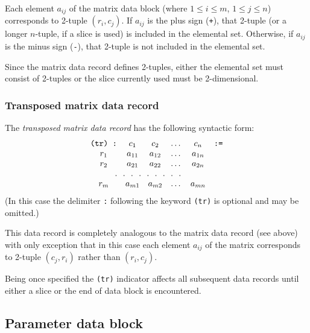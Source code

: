 \documentclass[10pt]{article}
\begin{document}
Each element $a_{ij}$ of the matrix data block (where $1\leq i\leq m$,
$1\leq j\leq n$) corresponds to 2-tuple $(r_i,c_j)$. If $a_{ij}$ is the
plus sign ({\tt+}), that 2-tuple (or a longer $n$-tuple, if a slice is
used) is included in the elemental set. Otherwise, if $a_{ij}$ is the
minus sign ({\tt-}), that 2-tuple is not included in the elemental set.

Since the matrix data record defines 2-tuples, either the elemental set
must consist of 2-tuples or the slice currently used must be
2-dimensional.

\subsubsection{Transposed matrix data record}

The {\it transposed matrix data record} has the following syntactic
form:
$$\begin{array}{cccccc}
\mbox{{\tt(tr) :}}&c_1&c_2&\dots&c_n&\mbox{{\tt:=}}\\
r_1&a_{11}&a_{12}&\dots&a_{1n}&\\
r_2&a_{21}&a_{22}&\dots&a_{2n}&\\
\multicolumn{5}{c}{.\ \ .\ \ .\ \ .\ \ .\ \ .\ \ .\ \ .\ \ .}&\\
r_m&a_{m1}&a_{m2}&\dots&a_{mn}&\\
\end{array}$$
(In this case the delimiter {\tt:} following the keyword {\tt(tr)} is
optional and may be omitted.)

This data record is completely analogous to the matrix data record (see
above) with only exception that in this case each element $a_{ij}$ of
the matrix corresponds to 2-tuple $(c_j,r_i)$ rather than $(r_i,c_j)$.

Being once specified the {\tt(tr)} indicator affects all subsequent
data records until either a slice or the end of data block is
encountered.

\subsection{Parameter data block}

\medskip

\end{document}

